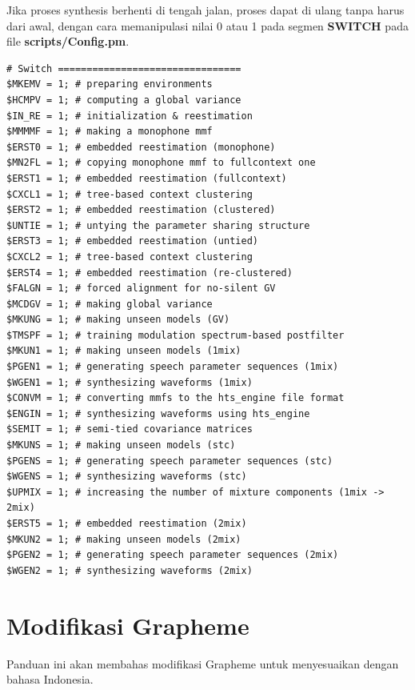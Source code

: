 \documentclass[12pt,]{article}
\begin{document}
	Jika proses synthesis berhenti di tengah jalan, proses dapat di ulang tanpa harus dari awal,
	dengan cara memanipulasi nilai 0 atau 1 pada segmen \textbf{SWITCH} pada file \textbf{scripts/Config.pm}.
	
	\begin{verbatim}
# Switch ================================
$MKEMV = 1; # preparing environments
$HCMPV = 1; # computing a global variance
$IN_RE = 1; # initialization & reestimation
$MMMMF = 1; # making a monophone mmf
$ERST0 = 1; # embedded reestimation (monophone)
$MN2FL = 1; # copying monophone mmf to fullcontext one
$ERST1 = 1; # embedded reestimation (fullcontext)
$CXCL1 = 1; # tree-based context clustering
$ERST2 = 1; # embedded reestimation (clustered)
$UNTIE = 1; # untying the parameter sharing structure
$ERST3 = 1; # embedded reestimation (untied)
$CXCL2 = 1; # tree-based context clustering
$ERST4 = 1; # embedded reestimation (re-clustered)
$FALGN = 1; # forced alignment for no-silent GV
$MCDGV = 1; # making global variance
$MKUNG = 1; # making unseen models (GV)
$TMSPF = 1; # training modulation spectrum-based postfilter
$MKUN1 = 1; # making unseen models (1mix)
$PGEN1 = 1; # generating speech parameter sequences (1mix)
$WGEN1 = 1; # synthesizing waveforms (1mix)
$CONVM = 1; # converting mmfs to the hts_engine file format
$ENGIN = 1; # synthesizing waveforms using hts_engine
$SEMIT = 1; # semi-tied covariance matrices
$MKUNS = 1; # making unseen models (stc)
$PGENS = 1; # generating speech parameter sequences (stc)
$WGENS = 1; # synthesizing waveforms (stc)
$UPMIX = 1; # increasing the number of mixture components (1mix -> 2mix)
$ERST5 = 1; # embedded reestimation (2mix)
$MKUN2 = 1; # making unseen models (2mix)
$PGEN2 = 1; # generating speech parameter sequences (2mix)
$WGEN2 = 1; # synthesizing waveforms (2mix)
	\end{verbatim}

	\newpage
	\section{Modifikasi Grapheme}
	
	Panduan ini akan membahas modifikasi Grapheme untuk menyesuaikan dengan bahasa Indonesia.
	
\end{document}
